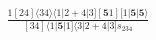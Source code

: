 \documentclass[varwidth, border=5pt]{standalone}
\begin{document}
\begin{my}
$\begin{gathered}
\scriptscriptstyle\frac{1[24]⟨34⟩⟨1|2+4|3][𝟓1][1|𝟓|𝟓⟩}{[34]⟨1|𝟓|1]⟨3|2+4|3]s_{234}}
\end{gathered}$
\end{my}
\end{document}
